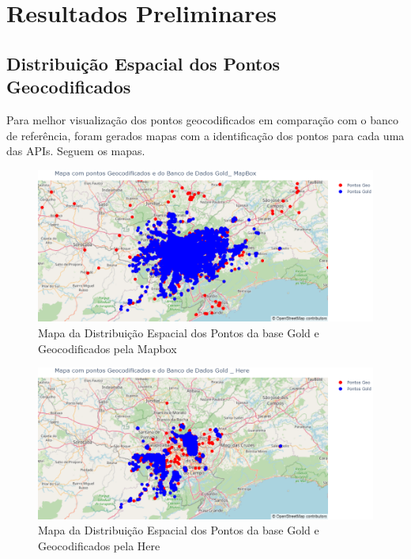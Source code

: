 \documentclass{article}
\begin{document}
\section{Resultados Preliminares}

\subsection{Distribuição Espacial dos Pontos Geocodificados}
Para melhor visualização dos pontos geocodificados em comparação com o banco de referência, foram gerados mapas com a identificação dos pontos para cada uma das APIs. Seguem os mapas. 

\begin{figure}[h]
  \centering
  \includegraphics[width=\textwidth]{mapapontos1.png}
  \caption{Mapa da Distribuição Espacial dos Pontos da base Gold e Geocodificados pela Mapbox}
  \label{fig:mapapontos1}
\end{figure}

\begin{figure}[h]
  \centering
  \includegraphics[width=\textwidth]{mapapontos2.png}
  \caption{Mapa da Distribuição Espacial dos Pontos da base Gold e Geocodificados pela Here}
  \label{fig:mapapontos2}
\end{figure}
\end{document}
